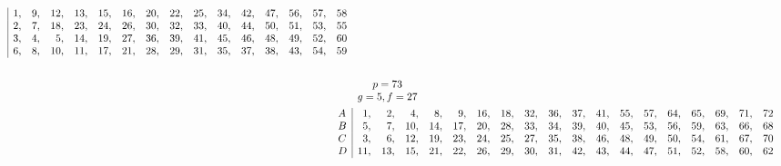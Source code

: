 \documentclass{book}
\theoremstyle{plain}
\theoremstyle{remark}
\begin{document}
\begin{align*}
\begin{array}{|rrrrrrrrrrrrrrr} 
1,&9,&12,&13,&15,&16,&20,&22,&25,&34,&42,&47,&56,&57,&58 \\ 
2,&7,& 18,&23,&24,&26,&30,&32,&33,&40,&44,&50,&51,&53,&55 \\ 
3,& 4,& 5,&14,&19,&27,&36,&39,&41,&45,&46,&48,&49,&52,&60 \\ 
6,&8,&10,&11,&17,&21,&28,& 29,&31,&35,&37,&38,&43,&54,&59
\end{array} \\
\hspace{1mm} \\
& \begin{array}{c} p=73 \\  g=5, f=27 \end{array} \\
\begin{array}{l} A \\ B \\ C \\D \end{array} & 
\begin{array}{|rrrrrrrrrrrrrrrrrr} 
1,&2,&4,&8,&9,&16,&18,&32,&36,&37,&41,&55,&57,&64,&65,&69,&71,&72 \\ 
5,&7,& 10,&14,&17,&20,&28,&33,&34,&39,&40,&45,&53,&56,&59,&63,&66,&68 \\ 
3,& 6,& 12,&19,&23,&24,&25,&27,&35,&38,&46,&48,&49,&50,&54,&61,&67,&70 \\ 
11,&13,&15,&21,&22,&26,&29,& 30,&31,&42,&43,&44,&47,&51,&52,&58,&60,&62
\end{array}  \\
\end{align*}
\end{document}
